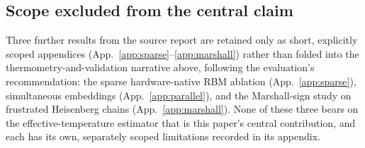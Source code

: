 \subsection{Scope excluded from the central claim}

Three further results from the source report are retained only as short, explicitly scoped appendices (App.~\ref{app:sparse}--\ref{app:marshall}) rather than folded into the thermometry-and-validation narrative above, following the evaluation's recommendation: the sparse hardware-native RBM ablation (App.~\ref{app:sparse}), simultaneous embeddings (App.~\ref{app:parallel}), and the Marshall-sign study on frustrated Heisenberg chains (App.~\ref{app:marshall}). None of these three bears on the effective-temperature estimator that is this paper's central contribution, and each has its own, separately scoped limitations recorded in its appendix.
